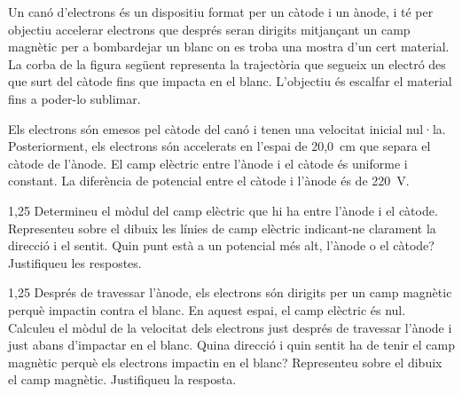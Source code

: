 Un canó d'electrons és un dispositiu format per un càtode i un ànode, i té per objectiu accelerar electrons que després seran dirigits mitjançant un camp magnètic per a bombardejar un blanc on es troba una mostra d'un cert material. La corba de la figura següent representa la trajectòria que segueix un electró des que surt del càtode fins que impacta en el blanc. L'objectiu és escalfar el material fins a poder-lo sublimar.

Els electrons són emesos pel càtode del canó i tenen una velocitat inicial nul·la. Posteriorment, els electrons són accelerats en l'espai de 20,0~cm que separa el càtode de l'ànode. El camp elèctric entre l'ànode i el càtode és uniforme i constant. La diferència de potencial entre el càtode i l'ànode és de 220~V.

\begin{apartat}{1,25}
Determineu el mòdul del camp elèctric que hi ha entre l'ànode i el càtode. Representeu sobre el dibuix les línies de camp elèctric indicant-ne clarament la direcció i el sentit. Quin punt està a un potencial més alt, l'ànode o el càtode? Justifiqueu les respostes.
\end{apartat}

\begin{apartat}{1,25}
Després de travessar l'ànode, els electrons són dirigits per un camp magnètic perquè impactin contra el blanc. En aquest espai, el camp elèctric és nul. Calculeu el mòdul de la velocitat dels electrons just després de travessar l'ànode i just abans d'impactar en el blanc. Quina direcció i quin sentit ha de tenir el camp magnètic perquè els electrons impactin en el blanc? Representeu sobre el dibuix el camp magnètic. Justifiqueu la resposta.
\end{apartat}


